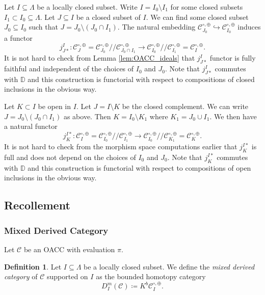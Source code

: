 \documentclass{amsart}
\newcommand{\scrC}{\mathcal{C}}
\newcommand{\DD}{\mathbb{D}}
\newcommand{\naivequotient}{/\!\!/}
\theoremstyle{definition}
\newtheorem{definition}[subsubsection]{Definition}
\numberwithin{equation}{subsection}
\begin{document}
Let $I \subseteq \Lambda$ be a locally closed subset. Write $I = I_0 \setminus I_1$ for some closed subsets $I_1 \subset I_0 \subseteq \Lambda$.
Let $J \subseteq I$ be a closed subset of $I$. We can find some closed subset $J_0 \subseteq I_0$ such that $J = J_0 \setminus (J_0 \cap I_1)$. 
The natural embedding $\scrC_{J_0}^{\circ, \oplus} \hookrightarrow \scrC_{I_0}^{\circ, \oplus}$ induces a functor
\[j_{J*}^I : \scrC_{J}^{\circ, \oplus} = \scrC_{J_0}^{\circ, \oplus} \naivequotient \scrC_{J_0\cap I_1}^{\circ, \oplus} \to \scrC_{I_0}^{\circ, \oplus} \naivequotient \scrC_{I_1}^{\circ, \oplus} = \scrC_I^{\circ, \oplus}.\]
It is not hard to check from Lemma \ref{lem:OACC_ideals} that $j_{J*}^I$ functor is fully faithful and independent of the choices of $I_0$ and $J_0$.
Note that $j_{J*}^I$ commutes with $\DD$ and this construction is functorial with respect to compositions of closed inclusions in the obvious way.

Let $K \subset I$ be open in $I$.
Let $J = I \setminus K$ be the closed complement. We can write $J = J_0 \setminus (J_0 \cap I_1)$ as above. Then $K = I_0 \setminus K_1$ where $K_1 = J_0 \cup I_1$.
We then have a natural functor
\[j_{K}^{I*} : \scrC_I^{\circ, \oplus} = \scrC_{I_0}^{\circ, \oplus} \naivequotient \scrC_{I_1}^{\circ, \oplus} \to \scrC_{I_0}^{\circ, \oplus} \naivequotient \scrC_{K_1}^{\circ, \oplus} =  \scrC_K^{\circ, \oplus}.\]
It is not hard to check from the morphism space computations earlier that $j_{K}^{I*}$ is full and does not depend on the choices of $I_0$ and $J_0$.
Note that $j_{K}^{I*}$ commutes with $\DD$ and this construction is functorial with respect to compositions of open inclusions in the obvious way.

\subsection{Recollement}

\subsubsection{Mixed Derived Category}

Let $\scrC$ be an OACC with evaluation $\pi$.

\begin{definition}
    Let $I \subseteq \Lambda$ be a locally closed subset.
    We define the \emph{mixed derived category} of $\scrC$ supported on $I$ as the bounded homotopy category
    \[D_I^m (\scrC) \coloneq K^b \scrC_{I}^{\circ, \oplus}.\]
\end{definition}
\end{document}
